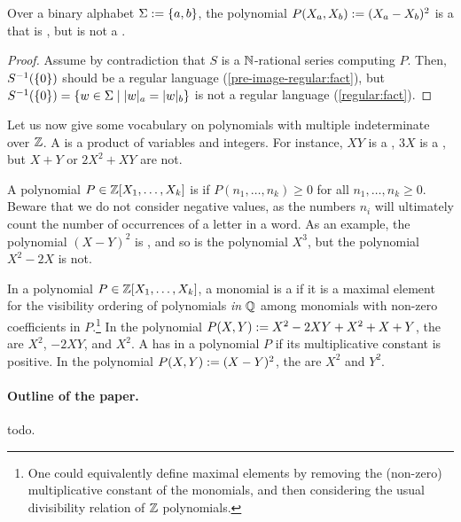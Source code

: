 \documentclass[a4paper,11pt]{article}
\begin{document}
\begin{example}
    Over a binary alphabet $\Sigma \mathrel{:=} \mathopen{\{} a,b \mathclose{\}}$,
    the polynomial $P(X_a, X_b) \mathrel{:=} (X_a - X_b)^2$
    is a  that is ,
    but is
    not a .
\end{example}
\begin{proof}
    Assume by contradiction that
    $S$ is a $\mathbb{N}$-rational series computing $P$.
    Then, $S^{-1}(\mathopen{\{} 0 \mathclose{\}})$ should be a regular language
    (\cref{pre-image-regular:fact}),
    but $S^{-1}(\set{0}) = \setof{ w \in \Sigma }{ \card[a]{w} = \card[b]{w} }$
    is not a regular language (\cref{regular:fact}).
\end{proof}


\AP Let us now give some vocabulary on polynomials with multiple indeterminate
over $\mathbb{Z}$. A  is a product of variables and integers. For
instance, $XY$ is a , $3 X$ is a , but $X + Y$ or
$2X^2 + XY$ are not.

\AP A polynomial $P \in \mathbb{Z}[X_1, \dots, X_k]$ is  if
$P(n_1, \dots, n_k) \geq 0$ for all $n_1, \dots, n_k \geq 0$. Beware that we do
not consider negative values, as the numbers $n_i$ will ultimately count the
number of occurrences of a letter in a word. As an example, the polynomial $(X
- Y)^2$ is , and so is the polynomial $X^3$, but the
polynomial $X^2 - 2X$ is not.

\AP
In a polynomial $P \in \mathbb{Z}[X_1, \dots, X_k]$, a monomial 
is a  if it is a maximal element
for the visibility ordering of polynomials \emph{in $\mathbb{Q}$}
among monomials with non-zero coefficients in $P$.\footnote{
    One could equivalently define maximal elements by removing the (non-zero)
    multiplicative constant of the monomials, and then
    considering the usual divisibility relation of $\mathbb{Z}$ polynomials.
}
In the polynomial 
$P(X,Y) \mathrel{:=} X^2 - 2XY + X^2 + X + Y$, the 
are $X^2$, $-2 XY$, and $X^2$.
A  has  in a polynomial $P$ if its
multiplicative constant is positive. In the polynomial $P(X,Y) \mathrel{:=} (X -
Y)^2$, the  are $X^2$ and $Y^2$.


\paragraph*{Outline of the paper.}
todo.
\end{document}
